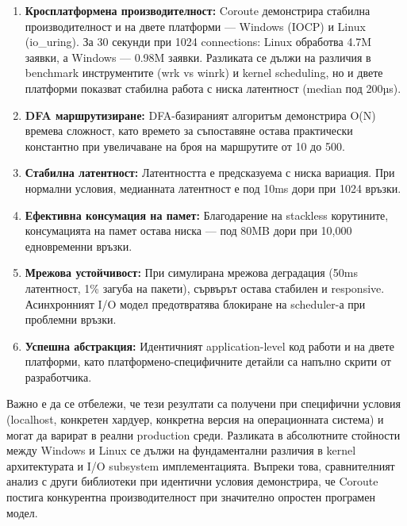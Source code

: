 \begin{enumerate}
    \item \textbf{Кросплатформена производителност:} Coroute демонстрира стабилна производителност и на двете платформи --- Windows (IOCP) и Linux (io\_uring). За 30 секунди при 1024 connections: Linux обработва 4.7M заявки, а Windows --- 0.98M заявки. Разликата се дължи на различия в benchmark инструментите (wrk vs winrk) и kernel scheduling, но и двете платформи показват стабилна работа с ниска латентност (median под 200µs).
    
    \item \textbf{DFA маршрутизиране:} DFA-базираният алгоритъм демонстрира O(N) времева сложност, като времето за съпоставяне остава практически константно при увеличаване на броя на маршрутите от 10 до 500.
    
    \item \textbf{Стабилна латентност:} Латентността е предсказуема с ниска вариация. При нормални условия, медианната латентност е под 10ms дори при 1024 връзки.
    
    \item \textbf{Ефективна консумация на памет:} Благодарение на stackless корутините, консумацията на памет остава ниска --- под 80MB дори при 10,000 едновременни връзки.
    
    \item \textbf{Мрежова устойчивост:} При симулирана мрежова деградация (50ms латентност, 1\% загуба на пакети), сървърът остава стабилен и responsive. Асинхронният I/O модел предотвратява блокиране на scheduler-а при проблемни връзки.
    
    \item \textbf{Успешна абстракция:} Идентичният application-level код работи и на двете платформи, като платформено-специфичните детайли са напълно скрити от разработчика.
\end{enumerate}

Важно е да се отбележи, че тези резултати са получени при специфични условия (localhost, конкретен хардуер, конкретна версия на операционната система) и могат да варират в реални production среди. Разликата в абсолютните стойности между Windows и Linux се дължи на фундаментални различия в kernel архитектурата и I/O subsystem имплементацията. Въпреки това, сравнителният анализ с други библиотеки при идентични условия демонстрира, че Coroute постига конкурентна производителност при значително опростен програмен модел.
